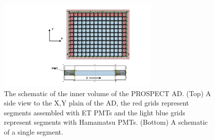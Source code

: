 \begin{figure}[h]
    \centering
    \includegraphics[width=0.7\textwidth]{Figures/PROSPECTAD_active.pdf}
    \caption[The inner volume of the PROSPECT AD]{The schematic of the inner volume of the PROSPECT AD.
    (Top) A side view to the X,Y plain of the AD, the red grids represent segments assembled with ET PMTs and the light blue grids represent segments with Hamamatsu PMTs.
    (Bottom) A schematic of a single segment.
    }
    \label{fig:active_volume}
\end{figure}

\label{sec:detection}

